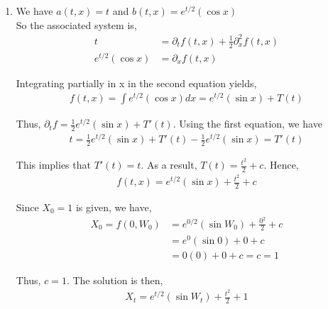 \documentclass[12pt]{article}
\newenvironment{problem}[2][Problem]{\begin{trivlist}
\item[\hskip \labelsep {\bfseries #1}\hskip \labelsep {\bfseries #2.}]}{\end{trivlist}}
\begin{document}
\begin{enumerate}[\alph*)]
\item We have $a(t,x) = t$ and $b(t,x) = e^{t/2}(\cos x)$\\

So the associated system is,
\begin{align*}
t &= \partial_t f(t,x) + \frac{1}{2} \partial_x^2 f(t,x)\\
e^{t/2}(\cos x) &= \partial_x f(t,x)
\end{align*}

Integrating partially in x in the second equation yields,
\begin{align*}
f(t,x) = \int e^{t/2}(\cos x) dx = e^{t/2}(\sin x) + T(t)
\end{align*}

Thus, $\partial_t f = \frac{1}{2} e^{t/2}(\sin x) + T'(t)$. Using the first equation, we have
\begin{align*}
t = \frac{1}{2}e^{t/2}(\sin x) + T'(t) - \frac{1}{2}e^{t/2}(\sin x) = T'(t)
\end{align*}

This implies that $T'(t) = t$. As a result, $T(t) = \frac{t^2}{2} + c$. Hence,
\begin{align*}
f(t,x) = e^{t/2}(\sin x) + \frac{t^2}{2} + c
\end{align*}

Since $X_0 = 1$ is given, we have,
\begin{align*}
X_0 = f(0, W_0) &= e^{0/2}(\sin W_0) + \frac{0^2}{2} + c\\
&= e^0(\sin 0) + 0 + c\\
&= 0(0) + 0 + c = c = 1
\end{align*}

Thus, $c = 1$. The solution is then,
\begin{align*}
X_t = e^{t/2}(\sin W_t) + \frac{t^2}{2} + 1
\end{align*}

\end{enumerate}

\begin{problem}{28}
\end{problem}
\end{document}
